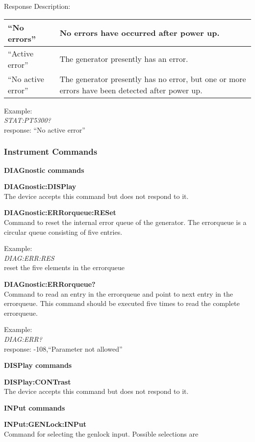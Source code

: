 Response Description:

\begin{tabular}{|p{10em}|p{22em}|}
\hline
``No errors'' 			& No errors have occurred after power up. \\ \hline
``Active error''		& The generator presently has an error. \\ \hline
``No active error''	& The generator presently has no error, but one or more errors have been detected after power up. \\
\hline
\end{tabular}

Example:\\
\textit{STAT:PT5300?}\\
response: ``No active error''

\subsubsection{Instrument Commands}

\textbf{DIAGnostic commands}

\textbf{DIAGnostic:DISPlay}\\
The device accepts this command but does not respond to it.

\textbf{DIAGnostic:ERRorqueue:RESet}\\
Command to reset the internal error queue of the generator. The errorqueue is a circular queue consisting of five entries.

Example:\\
\textit{DIAG:ERR:RES}\\
reset the five elements in the errorqueue

\textbf{DIAGnostic:ERRorqueue?}\\
Command to read an entry in the errorqueue and point to next entry in the errorqueue. This command should be executed five times to read the complete errorqueue.

Example:\\
\textit{DIAG:ERR?}\\
response: -108,``Parameter not allowed''

\textbf{DISPlay commands}

\textbf{DISPlay:CONTrast}\\
The device accepts this command but does not respond to it.

\textbf{INPut commands}

\textbf{INPut:GENLock:INPut}\\
Command for selecting the genlock input. Possible selections are 

